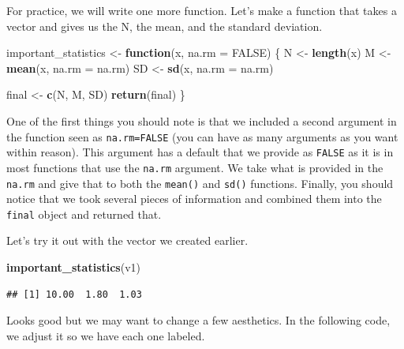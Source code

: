 \documentclass[]{tufte-book}
\newenvironment{Shaded}{}{}
\newcommand{\KeywordTok}[1]{\textcolor[rgb]{0.00,0.44,0.13}{\textbf{#1}}}
\newcommand{\DataTypeTok}[1]{\textcolor[rgb]{0.56,0.13,0.00}{#1}}
\newcommand{\StringTok}[1]{\textcolor[rgb]{0.25,0.44,0.63}{#1}}
\newcommand{\OtherTok}[1]{\textcolor[rgb]{0.00,0.44,0.13}{#1}}
\newcommand{\ControlFlowTok}[1]{\textcolor[rgb]{0.00,0.44,0.13}{\textbf{#1}}}
\newcommand{\NormalTok}[1]{#1}
\theoremstyle{definition}
\theoremstyle{definition}
\theoremstyle{remark}
\begin{document}
For practice, we will write one more function. Let's make a function
that takes a vector and gives us the N, the mean, and the standard
deviation.

\begin{Shaded}
\begin{Highlighting}[]
\NormalTok{important_statistics <-}\StringTok{ }\ControlFlowTok{function}\NormalTok{(x, }\DataTypeTok{na.rm =} \OtherTok{FALSE}\NormalTok{) \{}
\NormalTok{    N <-}\StringTok{ }\KeywordTok{length}\NormalTok{(x)}
\NormalTok{    M <-}\StringTok{ }\KeywordTok{mean}\NormalTok{(x, }\DataTypeTok{na.rm =}\NormalTok{ na.rm)}
\NormalTok{    SD <-}\StringTok{ }\KeywordTok{sd}\NormalTok{(x, }\DataTypeTok{na.rm =}\NormalTok{ na.rm)}
    
\NormalTok{    final <-}\StringTok{ }\KeywordTok{c}\NormalTok{(N, M, SD)}
    \KeywordTok{return}\NormalTok{(final)}
\NormalTok{\}}
\end{Highlighting}
\end{Shaded}

One of the first things you should note is that we included a second
argument in the function seen as \texttt{na.rm=FALSE} (you can have as
many arguments as you want within reason). This argument has a default
that we provide as \texttt{FALSE} as it is in most functions that use
the \texttt{na.rm} argument. We take what is provided in the
\texttt{na.rm} and give that to both the \texttt{mean()} and
\texttt{sd()} functions. Finally, you should notice that we took several
pieces of information and combined them into the \texttt{final} object
and returned that.

Let's try it out with the vector we created earlier.

\begin{Shaded}
\begin{Highlighting}[]
\KeywordTok{important_statistics}\NormalTok{(v1)}
\end{Highlighting}
\end{Shaded}

\begin{verbatim}
## [1] 10.00  1.80  1.03
\end{verbatim}

Looks good but we may want to change a few aesthetics. In the following
code, we adjust it so we have each one labeled.
\end{document}
